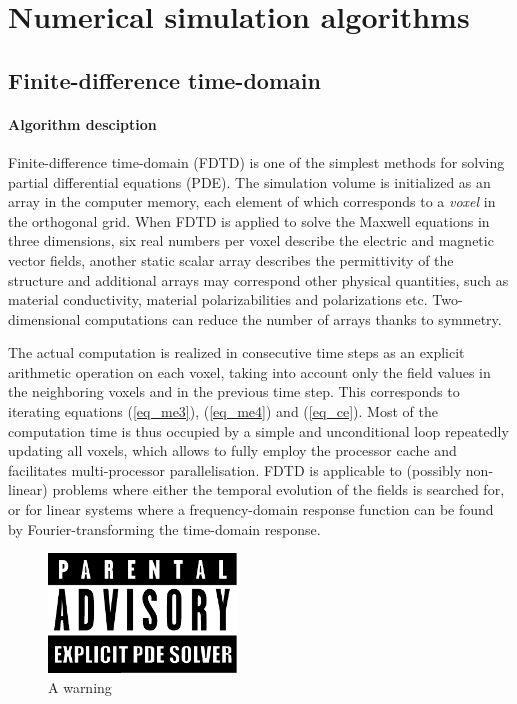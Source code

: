 \section{Numerical simulation algorithms} %
\subsection{Finite-difference time-domain} %
\paragraph{Algorithm desciption} %
Finite-difference time-domain (FDTD) is one of the simplest methods for solving partial differential equations (PDE). The simulation volume is initialized as an array in the computer memory, each element of which corresponds to a \textit{voxel} in the orthogonal grid. When FDTD is applied to solve the Maxwell equations in three dimensions, six real numbers per voxel describe the electric and magnetic vector fields, another static scalar array describes the permittivity of the structure and additional arrays may correspond other physical quantities, such as material conductivity, material polarizabilities and polarizations etc. Two-dimensional computations can reduce the number of arrays thanks to symmetry.

The actual computation is realized in consecutive time steps as an explicit arithmetic operation on each voxel, taking into account only the field values in the neighboring voxels and in the previous time step. This corresponds to iterating equations (\ref{eq_me3}), (\ref{eq_me4}) and (\ref{eq_ce}). %
Most of the computation time is thus occupied by a simple and unconditional loop repeatedly updating all voxels, which allows to fully employ the processor cache and facilitates multi-processor parallelisation. FDTD is applicable to (possibly non-linear) problems where either the temporal evolution of the fields is searched for, or for linear systems where a frequency-domain response function can be found by Fourier-transforming the time-domain response. 
\begin{figure}[h] \caption{A warning} \label{fg_parental} \centering 
	\includegraphics[width=5cm]{img/Parental_Advisory_label.pdf}
\end{figure}

